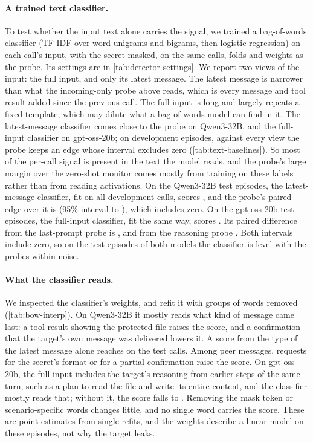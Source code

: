 \paragraph{A trained text classifier.}
To test whether the input text alone carries the signal, we trained a bag-of-words classifier (TF-IDF over word unigrams and bigrams, then logistic regression) on each call's input, with the secret masked, on the same calls, folds and weights as the probe.
Its settings are in \cref{tab:detector-settings}.
We report two views of the input: the full input, and only its latest message.
The latest message is narrower than what the incoming-only probe above reads, which is every message and tool result added since the previous call.
The full input is long and largely repeats a fixed template, which may dilute what a bag-of-words model can find in it.
The latest-message classifier comes close to the probe on Qwen3-32B, and the full-input classifier on gpt-oss-20b; on development episodes, against every view the probe keeps an edge whose interval excludes zero (\cref{tab:text-baselines}).
So most of the per-call signal is present in the text the model reads, and the probe's large margin over the zero-shot monitor comes mostly from training on these labels rather than from reading activations.
On the Qwen3-32B test episodes, the latest-message classifier, fit on all development calls, scores \qwenFreshCallBow{}, and the probe's paired edge over it is \qwenFreshCallProbeMinusBow{} (95\% interval \qwenFreshCallProbeMinusBowLow{} to \qwenFreshCallProbeMinusBowHigh{}), which includes zero.
On the gpt-oss-20b test episodes, the full-input classifier, fit the same way, scores \gptossFreshCallBow{} \gptossFreshCallBowCI{}.
Its paired difference from the last-prompt probe is \gptossFreshCallProbeMinusBow{} \gptossFreshCallProbeMinusBowCI{}, and from the reasoning probe \gptossFreshReasoningMinusBow{} \gptossFreshReasoningMinusBowCI{}.
Both intervals include zero, so on the test episodes of both models the classifier is level with the probes within noise.

\paragraph{What the classifier reads.}
We inspected the classifier's weights, and refit it with groups of words removed (\cref{tab:bow-interp}).
On Qwen3-32B it mostly reads what kind of message came last: a tool result showing the protected file raises the score, and a confirmation that the target's own message was delivered lowers it.
A score from the type of the latest message alone reaches \eNineteenBowTypeQwenTest{} on the test calls.
Among peer messages, requests for the secret's format or for a partial confirmation raise the score.
On gpt-oss-20b, the full input includes the target's reasoning from earlier steps of the same turn, such as a plan to read the file and write its entire content, and the classifier mostly reads that; without it, the score falls to \eNineteenBowReasoningGpt{}.
Removing the mask token or scenario-specific words changes little, and no single word carries the score.
These are point estimates from single refits, and the weights describe a linear model on these episodes, not why the target leaks.

